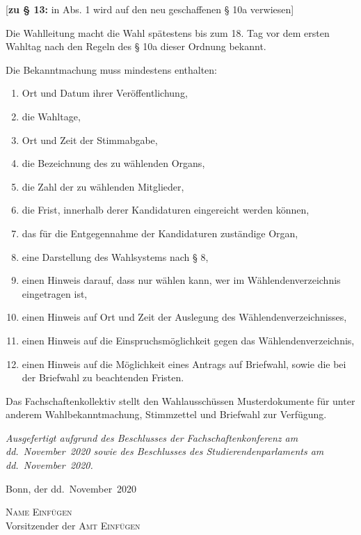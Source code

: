 \documentclass[%
draft,%
multilinesections%
]{fswo}
\newcommand\bemFr[1]{{\color{Red}[#1]}}
\newcommand\bemFr[1]{}%
\begin{document}
\bemFr{\textbf{zu § 13:} in Abs. 1 wird auf den neu geschaffenen § 10a verwiesen}
\begin{contract}
Die Wahlleitung macht die Wahl spätestens bis zum 18. Tag vor dem ersten Wahltag nach den Regeln des § 10a dieser Ordnung bekannt.

Die Bekanntmachung muss mindestens enthalten:
\begin{enumerate}
\item Ort und Datum ihrer Veröffentlichung,
\item die Wahltage,
\item Ort und Zeit der Stimmabgabe,
\item die Bezeichnung des zu wählenden Organs,
\item die Zahl der zu wählenden Mitglieder,
\item die Frist, innerhalb derer Kandidaturen eingereicht werden können,
\item das für die Entgegennahme der Kandidaturen zuständige Organ,
\item eine Darstellung des Wahlsystems nach § 8,
\item einen Hinweis darauf, dass nur wählen kann, wer im Wählendenverzeichnis eingetragen ist,
\item einen Hinweis auf Ort und Zeit der Auslegung des Wählendenverzeichnisses,
\item einen Hinweis auf die Einspruchsmöglichkeit gegen das Wählendenverzeichnis,
\item einen Hinweis auf die Möglichkeit eines Antrags auf Briefwahl, sowie die bei der Briefwahl zu beachtenden Fristen.
\end{enumerate}

Das Fachschaftenkollektiv stellt den Wahlausschüssen Musterdokumente für unter anderem Wahlbekanntmachung, Stimmzettel und Briefwahl zur Verfügung.
\end{contract}

\vspace{2em}
{\itshape%
Ausgefertigt aufgrund des Beschlusses der Fachschaftenkonferenz am dd.~November~2020 sowie des Beschlusses des Studierendenparlaments am dd.~November~2020.

Bonn, der dd.~November~2020}
\vspace{1em}
\begin{center}
\textsc{Name Einfügen}\\
Vorsitzender der \textsc{Amt Einfügen}
\end{center}
\end{document}

